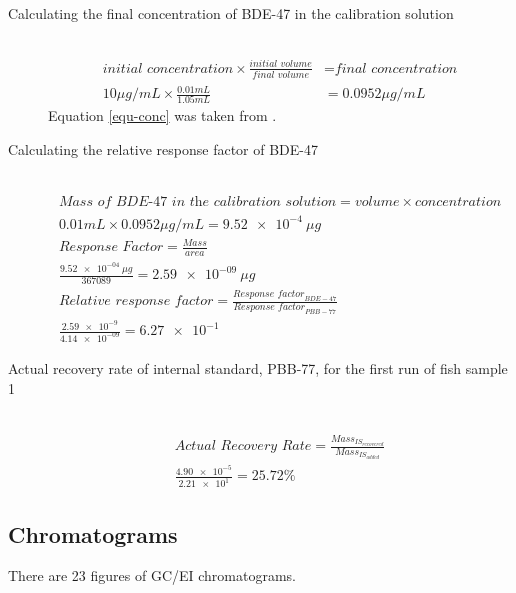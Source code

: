 \documentclass[a4paper, 12pt]{article}
\begin{document}
\begin{description}

	\item[Calculating the final concentration of BDE-47 in the calibration solution] \hfill \\
		\begin{equation} \label{equ-conc}
			\begin{split}
				\textit{initial concentration} \times \frac{\textit{initial volume}}{\textit{final volume}} & = \textit{final concentration} \\
				10 \si{\mu{}g/mL} \times \frac{0.01\si{mL}}{1.05\si{mL}} & = 0.0952 \si{\mu{}g/mL}
			\end{split}
		\end{equation}
		Equation \ref{equ-conc} was taken from \cite{harris}.

	\item[Calculating the relative response factor of BDE-47] \hfill \\
		\begin{gather*} \label{equ-rrf}
				\textit{Mass of BDE-47 in the calibration solution} = \textit{volume} \times \textit{concentration} \\
				0.01\si{mL} \times 0.0952 \si{\mu{}g/mL} = \SI{9.52e-4}{\mu{}g} \\
				\textit{Response Factor} = \frac{\textit{Mass}}{\textit{area}} \\
				\frac{\SI{9.52e-04}{\mu{}g}}{367089} = \SI{2.59e-09}{\mu{}g} \\
				\textit{Relative response factor} = \frac{\textit{Response factor}_{BDE-47}}{\textit{Response factor}_{PBB-77}} \\
				\frac{\num{2.59e-9}}{\num{4.14e-09}} = \num{6.27e-1}
		\end{gather*}

	\item[Actual recovery rate of internal standard, PBB-77, for the first run of fish sample 1] \hfill \\
		\begin{gather*}
			\textit{Actual Recovery Rate} = \frac{\textit{Mass}_{IS_{recovered}}}{\textit{Mass}_{IS_{added}}} \\
			\frac{\num{4.90e-5}}{\num{2.21e1}} = 25.72\%
		\end{gather*}

\end{description}


\subsection{Chromatograms}
There are 23 figures of GC/EI chromatograms.

\end{document}
